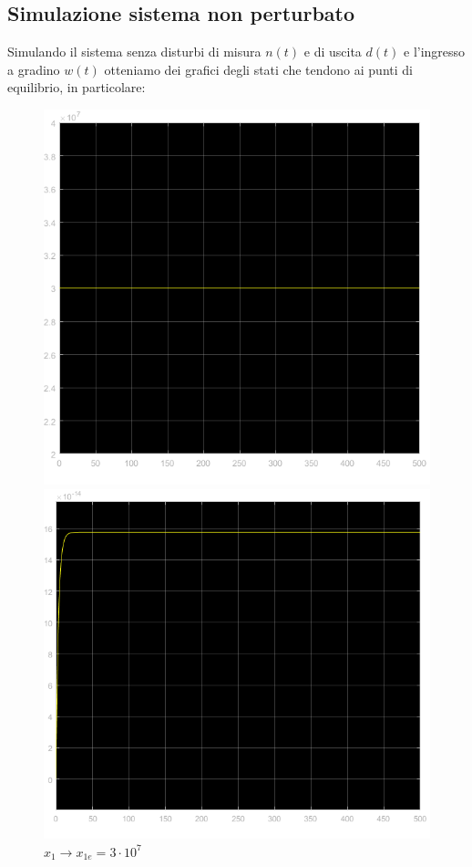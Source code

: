 \documentclass{article}
\begin{document}
\newpage 
\subsection{Simulazione sistema non perturbato}

Simulando il sistema senza disturbi di misura $n(t)$ e di uscita $d(t)$ e l'ingresso a gradino $w(t)$ otteniamo dei grafici degli stati che tendono ai punti di equilibrio, in particolare:
\\

\begin{figure}[!h]
   \begin{minipage}{0.5\textwidth}
     \centering
     \includegraphics[width=1.03\textwidth]{grafici/x1_1.png}
     \caption*{$x_1\longrightarrow x_{1e}=3\cdot10^7$}
   \end{minipage}\hfill
    \begin{minipage}{0.5\textwidth}
     \centering
     \includegraphics[width=1.1\textwidth]{grafici/x2_1.png}

\end{minipage}
\end{figure}
\end{document}
